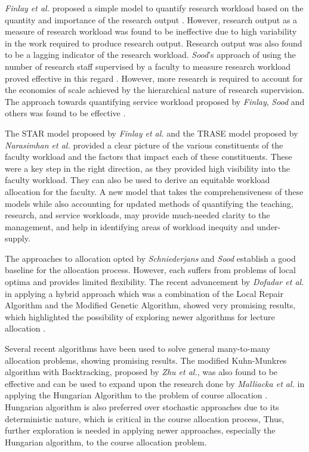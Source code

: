
\textit{Finlay et al.} proposed a simple model to quantify research workload based on the quantity and importance of the research output \cite{finlay1994management}. However, research output as a measure of research workload was found to be ineffective due to high variability in the work required to produce research output. Research output was also found to be a lagging indicator of the research workload. \textit{Sood}'s approach of using the number of research staff supervised by a faculty to measure research workload proved effective in this regard \cite{rohan2017}. However, more research is required to account for the economies of scale achieved by the hierarchical nature of research supervision. The approach towards quantifying service workload proposed by \textit{Finlay}, \textit{Sood} and others was found to be effective \cite{finlay1994management, rohan2017}.


The STAR model proposed by \textit{Finlay et al.} \cite{finlay1994management} and the TRASE model proposed by \textit{Narasimhan et al.} \cite{narasimhan32trase} provided a clear picture of the various constituents of the faculty workload and the factors that impact each of these constituents. These were a key step in the right direction, as they provided high visibility into the faculty workload. They can also be used to derive an equitable workload allocation for the faculty. A new model that takes the comprehensiveness of these models while also accounting for updated methods of quantifying the teaching, research, and service workloads, may provide much-needed clarity to the management, and help in identifying areas of workload inequity and under-supply.



The approaches to allocation opted by \textit{Schniederjans} and \textit{Sood} establish a good baseline for the allocation process. However, each suffers from problems of local optima and provides limited flexibility. The recent advancement by \textit{Dofadar et al.} in applying a hybrid approach which was a combination of the Local Repair Algorithm and the Modified Genetic Algorithm, showed very promising results, which highlighted the possibility of exploring newer algorithms for lecture allocation \cite{schniederjans1987goal, rohan2017, dofadar2021hybrid}.


Several recent algorithms have been used to solve general many-to-many allocation problems, showing promising results. The modified Kuhn-Munkres algorithm with Backtracking, proposed by \textit{Zhu et al.}, was also found to be effective and can be used to expand upon the research done by \textit{Malliacka et al.} in applying the Hungarian Algorithm to the problem of course allocation \cite{dofadar2021hybrid, zhu2016solving, mallicka2021claps}. Hungarian algorithm is also preferred over stochastic approaches due to its deterministic nature, which is critical in the course allocation process, Thus, further exploration is needed in applying newer approaches, especially the Hungarian algorithm, to the course allocation problem.

